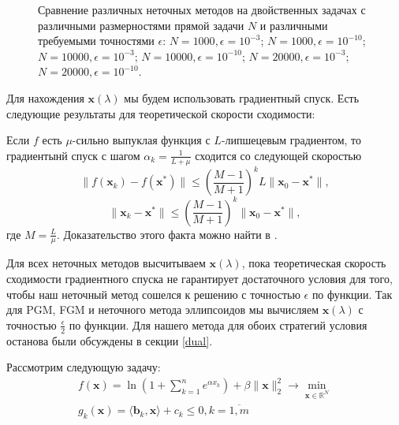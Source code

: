\documentclass[12pt]{article}
\begin{document}
\begin{figure}[ht!]
\hspace{2ex}
\hspace{2ex}
\caption{Сравнение различных неточных методов на двойственных задачах с различными размерностями прямой задачи $N$ и различными требуемыми точностями $\epsilon$:  $N=1000,\epsilon=10^{-3}$;  $N=1000,\epsilon=10^{-10}$;  $N=10000,\epsilon=10^{-3}$;  $N=10000,\epsilon=10^{-10}$;  $N=20000,\epsilon=10^{-3}$;  $N=20000,\epsilon=10^{-10}$. } \label{fig:image}
\end{figure}

Для нахождения $\textbf{x}(\lambda)$ мы будем использовать градиентный спуск. Есть следующие результаты для теоретической скорости сходимости:

Если $f$ есть $\mu$-сильно выпуклая функция с $L$-липшецевым градиентом, то градиентынй спуск с шагом $\alpha_k = \frac{1}{L+\mu}$ сходится со следующей скоростью
$$\|f(\textbf{x}_k)-f(\textbf{x}^*)\|\leq \left(\frac{M-1}{M+1}\right)^kL\|\textbf{x}_0-\textbf{x}^*\|,$$
$$\|\textbf{x}_k-\textbf{x}^*\|\leq \left(\frac{M-1}{M+1}\right)^k\|\textbf{x}_0-\textbf{x}^*\|,$$
где $M =\frac{L}{\mu}$. Доказательство этого факта можно найти в \cite{Polyak}.

Для всех неточных методов высчитываем $\textbf{x}(\lambda)$, пока теоретическая скорость сходимости градиентного спуска не гарантирует достаточного условия для того, чтобы наш неточный метод сошелся к решению с точностью $\epsilon$ по функции. Так для PGM, FGM и неточного метода эллипсоидов мы вычисляем $\textbf{x}(\lambda)$ с точностью $\frac{\epsilon}{2}$ по функции. Для нашего метода для обоих стратегий условия останова были обсуждены в секции \ref{dual}.

Рассмотрим следующую задачу:
\begin{gather}
\label{prime}
f(\textbf{x}) = \ln \left(1+\sum_{k=1}^ne^{\alpha x_k}\right) + \beta\|\textbf{x}\|_2^2\rightarrow \min\limits_{\textbf{x}\in \mathbb{R}^N}\\
g_k(\textbf{x}) = \langle \textbf{b}_k, \textbf{x}\rangle+c_k\leq0, k = \overline{1,m}\\
\end{gather}
\end{document}
